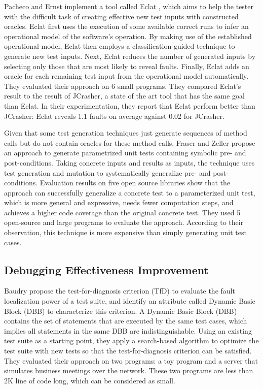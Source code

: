 Pacheco and Ernst implement a tool called Eclat \cite{Pacheco2005}, which aims to help the tester with the difficult task of creating effective new test inputs with constructed oracles. 
Eclat first uses the execution of some available correct runs to infer an operational model of the software's operation. 
By making use of the established operational model, Eclat then employs a classification-guided technique to generate new test inputs. 
Next, Eclat reduces the number of generated inputs by selecting only those that are most likely to reveal faults. 
Finally, Eclat adds an oracle for each remaining test input from the operational model automatically. 
They evaluated their approach on 6 small programs. 
They compared Eclat's result to the result of JCrasher, a state of the art tool that has the same goal than Eclat. 
In their experimentation, they report that Eclat perform better than JCrasher: Eclat reveals 1.1 faults on average against 0.02 for JCrasher.

Given that some test generation techniques just generate sequences of method calls but do not contain oracles for these method calls, Fraser and Zeller \cite{fraser2011generating} propose an approach to generate parametrized unit tests containing symbolic pre- and post-conditions. 
Taking concrete inputs and results as inputs, the technique uses test generation and mutation to systematically generalize pre- and post-conditions. 
Evaluation results on five open source libraries show that the approach can successfully generalize a concrete test to a parameterized unit test, which is more general and expressive, needs fewer computation steps, and achieves a higher code coverage than the original concrete test.
They used 5 open-source and large programs to evaluate the approach.
According to their observation, this technique is more expensive than simply generating unit test cases.

\subsection{Debugging Effectiveness Improvement}
\label{subsec:sota:category-1:debugging-improvement}

Baudry \etal \cite{Baudry:2006:ITS:1134285.1134299} propose the test-for-diagnosis criterion (TfD) to evaluate the fault localization power of a test suite, and identify an attribute called Dynamic Basic Block (DBB) to characterize this criterion.
A Dynamic Basic Block (DBB) contains the set of statements that are executed by the same test cases, which implies all statements in the same DBB are indistinguishable.
Using an existing test suite as a starting point, they apply a search-based algorithm to optimize the test suite with new tests so that the test-for-diagnosis criterion can be satisfied. 
They evaluated their approach on two programs: a toy program and a server that simulates business meetings over the network. 
These two programs are less than 2K line of code long, which can be considered as small.


